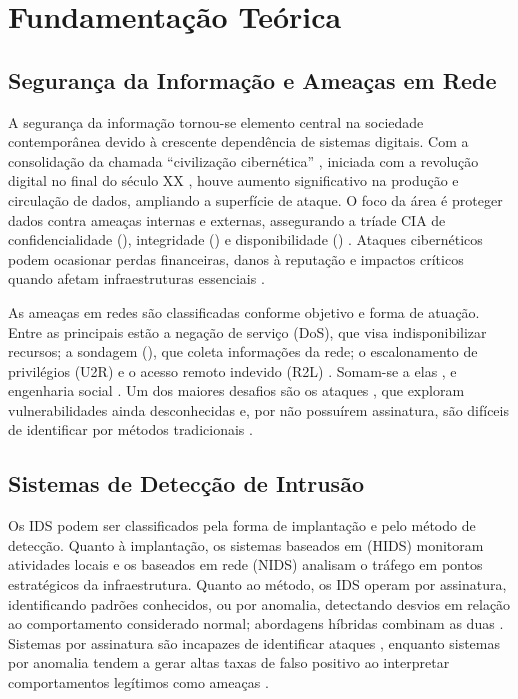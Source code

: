 \section{Fundamentação Teórica}

\subsection{Segurança da Informação e Ameaças em Rede}
A segurança da informação tornou-se elemento central na sociedade contemporânea
devido à crescente dependência de sistemas digitais. Com a consolidação da chamada
“civilização cibernética” \cite{wasyhun2023cyber}, iniciada com a revolução
digital no final do século XX \cite{Kazi2019network}, houve aumento significativo
na produção e circulação de dados, ampliando a superfície de ataque. O foco da área
é proteger dados contra ameaças internas e externas, assegurando a tríade CIA de
confidencialidade (), integridade () e
disponibilidade () \cite{diptiben2022cyber}. Ataques
cibernéticos podem ocasionar perdas financeiras, danos à reputação e impactos
críticos quando afetam infraestruturas essenciais \cite{wasyhun2023cyber}.

As ameaças em redes são classificadas conforme objetivo e forma de atuação. Entre
as principais estão a negação de serviço (DoS), que visa indisponibilizar
recursos; a sondagem (), que coleta informações da rede; o
escalonamento de privilégios (U2R) e o acesso remoto indevido (R2L)
\cite{wasyhun2023cyber}. Somam-se a elas ,  e engenharia
social \cite{Thakkar2021Survey, solane2015using}. Um dos maiores desafios são os
ataques , que exploram vulnerabilidades ainda desconhecidas e, por não
possuírem assinatura, são difíceis de identificar por métodos tradicionais
\cite{wasyhun2023cyber}.

\subsection{Sistemas de Detecção de Intrusão}
Os IDS podem ser classificados pela forma de implantação e pelo método de detecção.
Quanto à implantação, os sistemas baseados em  (HIDS) monitoram atividades
locais e os baseados em rede (NIDS) analisam o tráfego em pontos estratégicos da
infraestrutura. Quanto ao método, os IDS operam por assinatura, identificando
padrões conhecidos, ou por anomalia, detectando desvios em relação ao comportamento
considerado normal; abordagens híbridas combinam as duas
\cite{Khraisat2019Survey, zehedi2023comparative, Thakkar2021Survey, Khraisat2019Hybrid}.
Sistemas por assinatura são incapazes de identificar ataques ,
enquanto sistemas por anomalia tendem a gerar altas taxas de falso positivo ao
interpretar comportamentos legítimos como ameaças \cite{Kazi2019network}.

